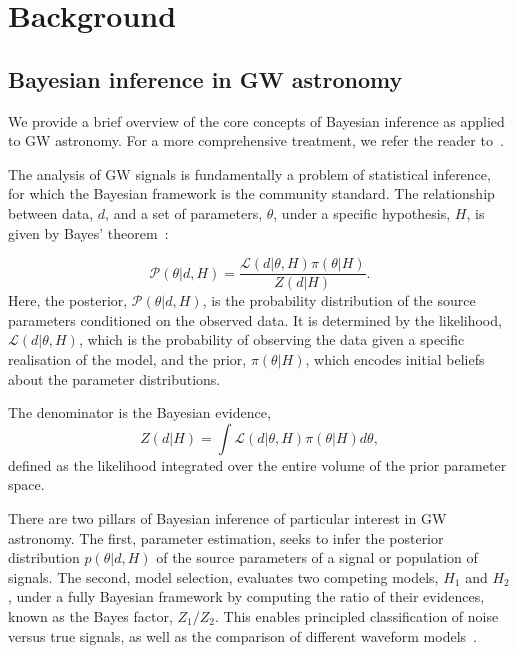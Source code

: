 \documentclass[fleqn,usenatbib]{mnras}
\begin{document}
\section{Background}
\label{sec:background}

\subsection{Bayesian inference in GW astronomy}
\label{sec:background_bayes}
We provide a brief overview of the core concepts of
Bayesian inference as applied to GW astronomy. For a more
comprehensive treatment, we refer the reader to~\cite{skilling, Thrane_2019, lal, bilby_paper, LIGO_guide_signalextraction}.

The analysis of GW signals is fundamentally a problem of statistical
inference, for which the Bayesian framework is the community standard.
The relationship between data, $d$, and a set of parameters,
$\theta$, under a specific hypothesis, $H$, is given by Bayes' theorem~\citep{Bayes1763}:

\begin{equation}
    \mathcal{P}(\theta|d, H) = \frac{\mathcal{L}(d|\theta, H) \pi(\theta|H)}{Z(d|H)}.
    \label{eq:bayes_theorem}
\end{equation}%
Here, the posterior, $\mathcal{P}(\theta|d, H)$, is the probability distribution
of the source parameters conditioned on the observed data. It is
determined by the likelihood, $\mathcal{L}(d|\theta, H)$, which is the
probability of observing the data given a specific realisation of the
model, and the prior, $\pi(\theta|H)$, which encodes initial beliefs
about the parameter distributions.

The denominator is the Bayesian evidence,
\begin{equation}
    Z(d|H) = \int \mathcal{L}(d|\theta, H) \pi(\theta|H) d\theta,
    \label{eq:evidence}
\end{equation}
defined as the likelihood integrated over the entire volume of the
prior parameter space.

There are two pillars of Bayesian inference of particular interest
in GW astronomy. The first, parameter estimation, seeks to infer 
the posterior distribution $p(\theta|d, H)$ of the source parameters of a signal or population of signals.
The second, model selection, evaluates two competing
models, $H_1$ and $H_2$, under a fully Bayesian framework by computing the ratio of
their evidences, known as the Bayes factor, $Z_1 / Z_2$. This enables
principled classification of noise versus true signals, as well as the 
comparison of different waveform models~\citep{LIGO_guide_signalextraction}.
\end{document}
